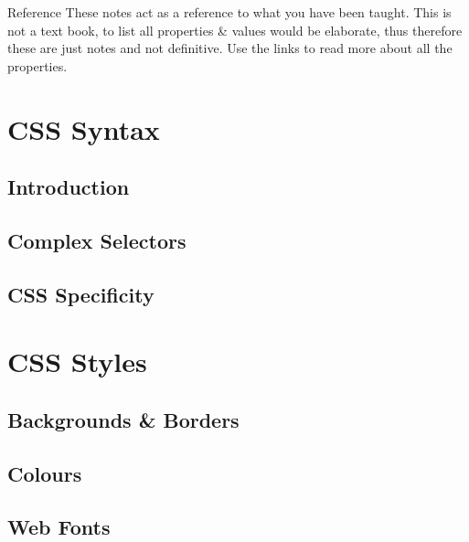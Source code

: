 \documentclass[b5paper,openany]{book}
\begin{document}
\tp


\tableofcontents



\begin{infobox}{Reference}
    These notes act as a reference to what you have been taught. This is not a text book, to list all properties \& values would be elaborate, thus therefore these are just notes and not definitive. Use the links to read more about all the properties.
\end{infobox}


\chapter{CSS Syntax}

\section{Introduction}


\section{Complex Selectors}


\section{CSS Specificity}


\chapter{CSS Styles}

\section{Backgrounds \& Borders}


\section{Colours}


\section{Web Fonts}

\end{document}

